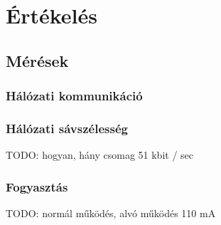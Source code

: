 \chapter{Értékelés}

\section{Mérések}

\subsection{Hálózati kommunikáció}
\subsection{Hálózati sávszélesség}
TODO: hogyan, hány csomag
51 kbit / sec
\subsection{Fogyasztás}
TODO: normál működés, alvó működés
110 mA

